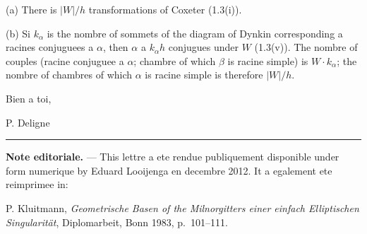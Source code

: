 \documentclass[11pt,a4paper]{article}
\theoremstyle{plain}
\theoremstyle{definition}
\begin{document}
\smallskip

(a) There is $|W|/h$ transformations of Coxeter (1.3(i)).

\smallskip

(b) Si $k_\alpha$ is the nombre of sommets of the diagram of Dynkin corresponding a racines conjuguees a $\alpha$, then $\alpha$ a $k_\alpha h$ conjugues under $W$ (1.3(v)). The nombre of couples (racine conjuguee a $\alpha$; chambre of which $\beta$ is racine simple) is $W \cdot k_\alpha$; the nombre of chambres of which $\alpha$ is racine simple is therefore $|W|/h$.

\vspace{1cm}

\begin{flushright}
Bien a toi,

\vspace{0.3cm}
P. Deligne
\end{flushright}

\vspace{1cm}

\noindent\rule{\textwidth}{0.4pt}

\vspace{0.3cm}

\noindent
\textbf{Note editoriale.} --- This lettre a ete rendue publiquement disponible under form numerique by Eduard Looijenga en decembre 2012. It a egalement ete reimprimee in:

P. Kluitmann, \textit{Geometrische Basen of the Milnorgitters einer einfach Elliptischen Singularit\"at}, Diplomarbeit, Bonn 1983, p.~101--111.
\end{document}
